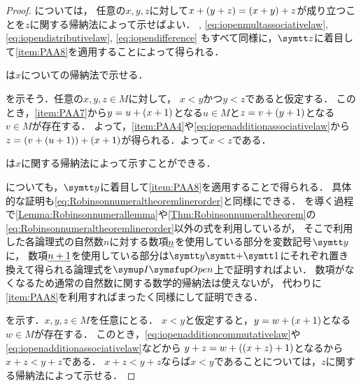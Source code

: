 \begin{proof}
	については，
	任意の\(x, y, z\)に対して\(x + \paren{y + z} = \paren{x + y} + z\)が成り立つことを\(z\)に関する帰納法によって示せばよい．
	,  \cref{eq:iopenmultassociativelaw}, \cref{eq:iopendistributivelaw}, \cref{eq:iopendifference}
	もすべて同様に，\(\obj{z}\)に着目して\cref{item:PAA8}を適用することによって得られる．

	は\(x\)についての帰納法で示せる．

	を示そう．任意の\(x, y, z \in M\)に対して，
	\(x < y\)かつ\(y < z\)であると仮定する．
	このとき，\cref{item:PAA7}から\(y = u + \paren{x + 1}\)となる\(u \in M\)と\(z = v + \paren{y + 1}\)となる\(v \in M\)が存在する．
	よって，\cref{item:PAA4}や\cref{eq:iopenadditionassociativelaw}から
	\(z = \paren{v + \paren{u + 1}} + \paren{x + 1}\)が得られる．よって\(x < z\)である．

	は\(x\)に関する帰納法によって示すことができる．

	についても，\(\obj{y}\)に着目して\cref{item:PAA8}を適用することで得られる．
	具体的な証明も\cref{eq:Robinsonnumeraltheoremlinerorder}と同様にできる．
	を導く過程で\cref{Lemma:Robinsonnumerallemma}や\cref{Thm:Robinsonnumeraltheorem}の
	\cref{eq:Robinsonnumeraltheoremlinerorder}以外の式を利用しているが，
	そこで利用した各論理式の自然数\(n\)に対する数項\(\underline{n}\)を使用している部分を変数記号\(\obj{y}\)に，
	数項\(\underline{n + 1}\)を使用している部分は\(\obj{y} \obj{+} \obj{1}\)にそれぞれ置き換えて得られる論理式を\(\OpenFormulaInduction\)上で証明すればよい．
	数項がなくなるため通常の自然数に関する数学的帰納法は使えないが，
	代わりに\cref{item:PAA8}を利用すればまったく同様にして証明できる．

	を示す．\(x, y, z \in M\)を任意にとる．
	\(x < y\)と仮定すると，\(y = w + \paren{x + 1}\)となる\(w \in M\)が存在する．
	このとき，\cref{eq:iopenadditioncommutativelaw}や\cref{eq:iopenadditionassociativelaw}などから
	\(y + z = w + \paren{\paren{x + z} + 1}\)となるから\(x + z < y + z\)である．
	\(x + z < y + z\)ならば\(x < y\)であることについては，\(z\)に関する帰納法によって示せる．


\end{proof}
